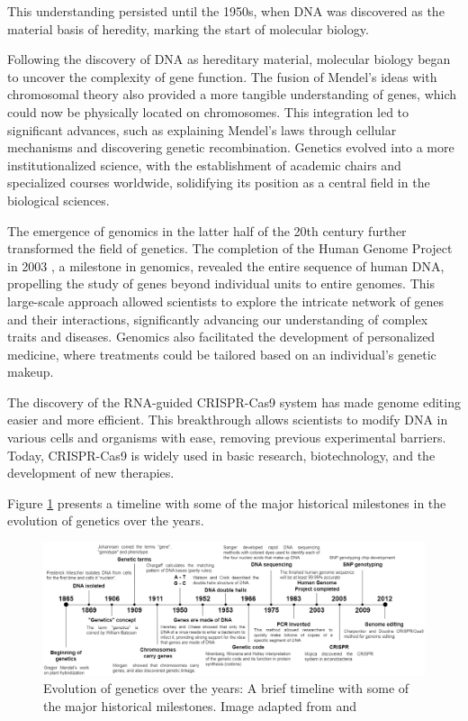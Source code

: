 This understanding persisted until the 1950s, when DNA was discovered as the material basis of heredity, marking the start of molecular biology. \cite{Gayon2016}

Following the discovery of DNA as hereditary material, molecular biology began to uncover the complexity of gene function. The fusion of Mendel's ideas with chromosomal theory also provided a more tangible understanding of genes, which could now be physically located on chromosomes. This integration led to significant advances, such as explaining Mendel's laws through cellular mechanisms and discovering genetic recombination. Genetics evolved into a more institutionalized science, with the establishment of academic chairs and specialized courses worldwide, solidifying its position as a central field in the biological sciences. \cite{Gayon2016}

The emergence of genomics in the latter half of the 20th century further transformed the field of genetics. The completion of the Human Genome Project in 2003 \cite{Collins1995}, a milestone in genomics, revealed the entire sequence of human DNA, propelling the study of genes beyond individual units to entire genomes. This large-scale approach allowed scientists to explore the intricate network of genes and their interactions, significantly advancing our understanding of complex traits and diseases. Genomics also facilitated the development of personalized medicine, where treatments could be tailored based on an individual's genetic makeup. \cite{Gayon2016}

The discovery of the RNA-guided CRISPR-Cas9 system has made genome editing easier and more efficient. This breakthrough allows scientists to modify DNA in various cells and organisms with ease, removing previous experimental barriers. Today, CRISPR-Cas9 is widely used in basic research, biotechnology, and the development of new therapies. \cite{CRISPR-CAS9}

Figure \ref{fig:timeline} presents a timeline with some of the major historical milestones in the evolution of genetics over the years.

\begin{figure}[H]
    \centering
    \includegraphics[width=1\textwidth]{figs/timeline.png}
    \caption{Evolution of genetics over the years: A brief timeline with some of the major historical milestones. Image adapted from \cite{genetictimeline} and \cite{genetictimeline2}}
    \label{fig:timeline}
\end{figure}

